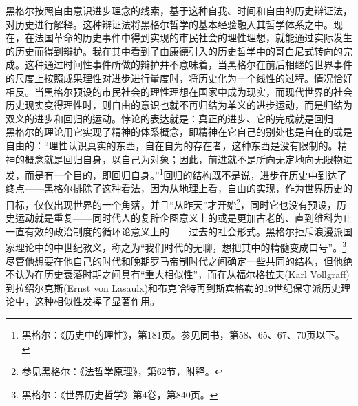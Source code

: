 黑格尔按照自由意识进步理念的线索，基于这种自我、时间和自由的历史辩证法，对历史进行解释。这种辩证法将黑格尔哲学的基本经验融入其哲学体系之中。现在，在法国革命的历史事件中得到实现的市民社会的理性理想，就能通过实际发生的历史而得到辩护。我在其中看到了由康德引入的历史哲学中的哥白尼式转向的完成。这种通过时间性事件所做的辩护并不意味着，当黑格尔在前后相继的世界事件的尺度上按照成果理性对进步进行量度时，将历史化为一个线性的过程。情况恰好相反。当黑格尔预设的市民社会的理性理想在国家中成为现实，而现代世界的社会历史现实变得理性时，则自由的意识也就不再归结为单义的进步运动，而是归结为双义的进步和回归的运动。悖论的表达就是：真正的进步、它的完成就是回归——黑格尔的理论用它实现了精神的体系概念，即精神在它自己的别处也是自在的或是自由的：“理性认识真实的东西，自在自为的存在者，这种东西是没有限制的。精神的概念就是回归自身，以自己为对象；因此，前进就不是所向无定地向无限物进发，而是有一个目的，即回归自身。”\footnote{黑格尔：《历史中的理性》，第181页。参见同书，第58、65、67、70页以下。}回归的结构既不是说，进步在历史中到达了终点——黑格尔排除了这种看法，因为从地理上看，自由的实现，作为世界历史的目标，仅仅出现世界的一个角落，并且“从昨天”才开始\footnote{参见黑格尔：《法哲学原理》，第62节，附释。}，同时它也没有预设，历史运动就是重复——同时代人的复辟企图意义上的或是更加古老的、直到维科为止一直有效的政治制度的循环论意义上的——过去的社会形式。黑格尔拒斥浪漫派国家理论中的中世纪教义，称之为“我们时代的无聊，想把其中的精髓变成口号”。\footnote{黑格尔：《世界历史哲学》第4卷，第840页。}尽管他想要在他自己的时代和晚期罗马帝制时代之间确定一些共同的结构，但他绝不认为在历史衰落时期之间具有“重大相似性”，而在从福尔格拉夫(Karl Vollgraff)到拉绍尔克斯(Ernst von Lasaulx)和布克哈特再到斯宾格勒的19世纪保守派历史理论中，这种相似性发挥了显著作用。

